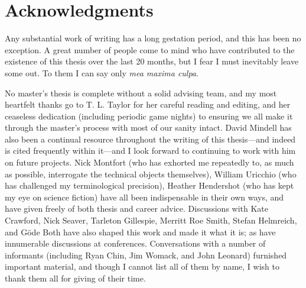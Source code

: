 
\cleardoublepage
\setcounter{savepage}{\thepage}
\begin{abstractpage}

\end{abstractpage}

% 

\cleardoublepage

\section*{Acknowledgments}

Any substantial work of writing has a long gestation period, and this
has been no exception. A great number of people come to mind who have
contributed to the existence of this thesis over the last 20 months,
but I fear I must 
inevitably leave some out. To them I can say only \emph{mea maxima culpa}. 

No master's thesis is complete without a
solid advising team, and my most heartfelt thanks go to T. L. Taylor
for her careful reading and editing, and her ceaseless dedication (including periodic
game nights) to ensuring we all make it through the master's process with most of our
sanity intact. David Mindell has also been a continual resource
throughout the writing of this thesis---and indeed is cited frequently
within it---and I look forward to continuing to work with him on
future projects. Nick Montfort (who has exhorted me repeatedly to, as
much as possible, interrogate the technical objects themselves),
William Uricchio (who has challenged my terminological precision),
Heather Hendershot (who has kept my eye on science fiction) have all
been indispensable in their own ways, and have given freely of both
thesis and career advice. Discussions with Kate Crawford, Nick Seaver,
Tarleton Gillespie, Merritt Roe Smith, Stefan Helmreich, and G\"{o}de Both have also
shaped this work and made it what it is; as have innumerable
discussions at conferences. Conversations with a number of informants
(including Ryan Chin, Jim Womack, and John Leonard)
furnished important material, and though I cannot list all of them by
name, I wish to thank them all for giving of their time.

